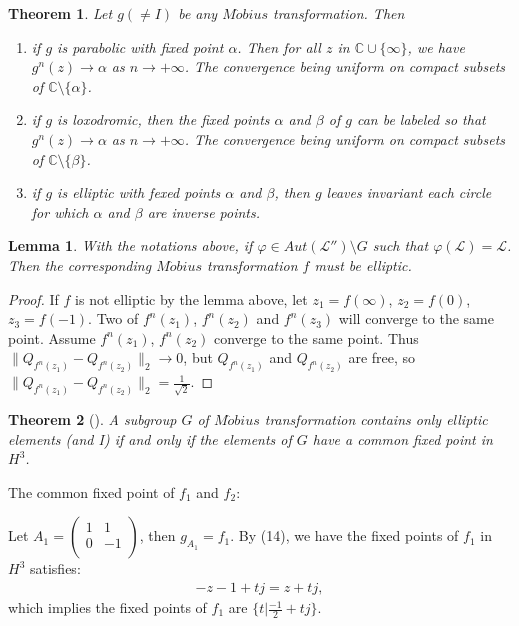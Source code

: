 \documentclass{amsart}
\newcommand{\LLL}{\mathcal L} %
\newcommand{\C}{\mathbb C} %
\newtheorem{theorem}{Theorem}[section]
\newtheorem{lemma}{Lemma}[section]
\begin{document}
\begin{theorem}
Let $g (\neq I)$ be any $M\ddot{o}bius$ transformation. Then
\begin{enumerate}
\item if $g$ is parabolic with fixed point $\alpha$. Then for all $z$ in $\C \cup \{\infty \}$, we have
$g^{n}(z) \rightarrow \alpha$ as $n \rightarrow +\infty$. The convergence being uniform on compact subsets of $\C \setminus \{ \alpha \}$.
\item if $g$ is loxodromic, then the fixed points $\alpha$ and $\beta$ of $g$ can be labeled so that $g^{n}(z) \rightarrow \alpha$ as
$n \rightarrow +\infty$. The convergence being uniform on compact subsets of $\C \setminus \{ \beta \}$.
\item if $g$ is elliptic with fexed points $\alpha$ and $\beta$, then $g$ leaves invariant each circle for which
$\alpha$ and $\beta$ are inverse points.
\end{enumerate}
\end{theorem}

\begin{lemma}
With the notations above, if $\varphi \in Aut(\LLL'') \setminus G$ such that
$\varphi(\LLL) = \LLL$. Then the corresponding $M\ddot{o}bius$ transformation $f$ must be elliptic.
\end{lemma}

\begin{proof}
If $f$ is not elliptic by the lemma above, let $z_1 = f(\infty)$, $z_2 = f(0)$, $z_3 = f(-1)$.
Two of $f^{n}(z_1)$, $f^{n}(z_2)$ and $f^{n}(z_3)$ will converge to the same point. Assume $f^{n}(z_1)$, $f^{n}(z_2)$ converge to the same point.
Thus $\parallel Q_{f^{n}(z_1)} - Q_{f^{n}(z_2)} \parallel_{2} \rightarrow 0 $, but $Q_{f^{n}(z_1)}$ and $Q_{f^{n}(z_2)}$ are free, so
$\parallel Q_{f^{n}(z_1)} - Q_{f^{n}(z_2)} \parallel_{2} = \frac{1}{\sqrt{2}}$.
\end{proof}

\begin{theorem}[\cite{BA}]
A subgroup $G$ of $M\ddot{o}bius$ transformation contains only elliptic elements (and I) if and only if
the elements of $G$ have a common fixed point in $H^3$.
\end{theorem}

The common fixed point of $f_1$ and $f_2$:

Let $A_1 = \left(
             \begin{array}{cc}
               1 & 1 \\
               0 & -1 \\
             \end{array}
           \right)$, then $g_{A_1} = f_1$. By (14), we have the fixed points of $f_1$ in $H^3$ satisfies:
\begin{align*}
-z -1 + tj = z + tj,
\end{align*}
which implies the fixed points of $f_1$ are $\{ t | \frac{-1}{2} + tj \}$.
\end{document}
